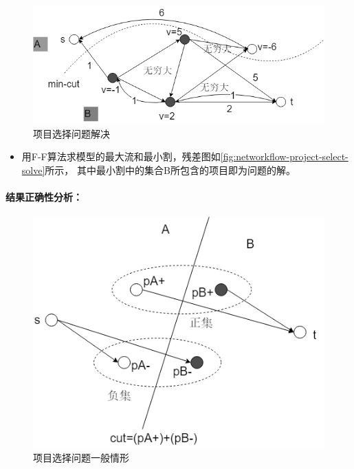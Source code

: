 \begin{figure}[htb]
	\centering
	\includegraphics[scale=0.6]{image/networkflow10.png}
	\caption{项目选择问题解决}\label{fig:networkflow-project-select-solve}
\end{figure}

\begin{itemize}
	\item 用F-F算法求模型的最大流和最小割，残差图如\autoref{fig:networkflow-project-select-solve}所示，
	      其中最小割中的集合B所包含的项目即为问题的解。
\end{itemize}

\paragraph*{结果正确性分析：}
\begin{figure}[htb]
	\centering
	\includegraphics[scale=0.6]{image/networkflow11.png}
	\caption{项目选择问题一般情形}\label{fig:networkflow-project-select-general}
\end{figure}

